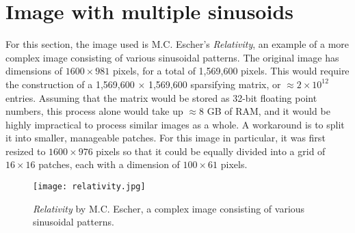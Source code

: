\section{Image with multiple sinusoids}
\label{sec:2dmultisin}
For this section, the image used is M.C. Escher's \textit{Relativity}, an example of a more complex image consisting of various sinusoidal patterns. The original image has dimensions of $1600 \times 981$ pixels, for a total of 1,569,600 pixels. This would require the construction of a 1,569,600 $\times$ 1,569,600 sparsifying matrix, or $\approx 2 \times 10^{12}$ entries. Assuming that the matrix would be stored as 32-bit floating point numbers, this process alone would take up $\approx 8$ GB of RAM, and it would be highly impractical to process similar images as a whole. A workaround is to split it into smaller, manageable patches. For this image in particular, it was first resized to $1600 \times 976$ pixels so that it could be equally divided into a grid of $16 \times 16$ patches, each with a dimension of $100 \times 61$ pixels.


\begin{figure}[tb]
	\texttt{[image: relativity.jpg]}
	\caption{\textit{Relativity} by M.C. Escher, a complex image consisting of various sinusoidal patterns.}
	\label{fig:relativity}
\end{figure}